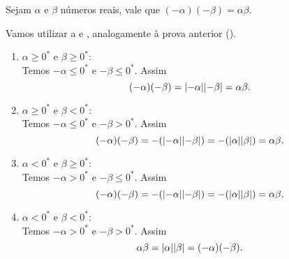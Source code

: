 \documentclass[../main.tex]{subfiles}
\begin{document}
\begin{prop}\label{reais-teo-regraSinaisProduto2}
    Sejam $\alpha$ e $\beta$ números reais, vale que $\left( -\alpha \right) \left( -\beta \right) = \alpha \beta$.
\end{prop}
\begin{dem}
    Vamos utilizar a  e , analogamente à prova anterior ().
    \begin{enumerate}
        \item $\alpha \geq 0^*$ e $\beta \geq 0^*$: \\
            Temos $-\alpha \leq 0^*$ e $-\beta \leq 0^*$. Assim
            \[ (-\alpha)(-\beta) = \abs{-\alpha}\abs{-\beta} = \alpha\beta.\]
        
        \item $\alpha \geq 0^*$ e $\beta < 0^*$: \\
        Temos $-\alpha \leq 0^*$ e $-\beta > 0^*$. Assim
            \[ (-\alpha)(-\beta) = -(\abs{-\alpha}\abs{-\beta}) = -(\abs{\alpha}\abs{\beta}) = \alpha\beta .\]
        \item $\alpha < 0^*$ e $\beta \geq 0^*$: \\
         Temos $-\alpha > 0^*$ e $-\beta \leq 0^*$. Assim
         \[ (-\alpha)(-\beta) = -(\abs{-\alpha}\abs{-\beta}) = -(\abs{\alpha}\abs{\beta}) = \alpha\beta .\]
        \item $\alpha < 0^*$ e $\beta < 0^*$: \\
            Temos $-\alpha > 0^*$ e $-\beta > 0^*$. Assim
            \[\alpha\beta = \abs{\alpha}\abs{\beta} = (-\alpha)(-\beta). \]
    \end{enumerate}
\end{dem}
\end{document}
